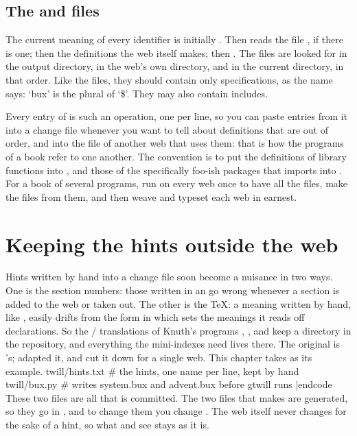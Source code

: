 \section{The  and  files}
The current meaning of every identifier is initially .
Then  reads the file , if there is one; then the
definitions the web itself makes; then . The  files are
looked for in the output directory, in the web's own directory, and in the
current directory, in that order. Like the  files, they should contain
only  specifications, as the name says: `bux' is the plural of `\$'. They
may also contain  includes.

Every entry of  is such an  operation, one per line, so you
can paste entries from it into a change file whenever you want to tell
 about definitions that are out of order, and into the  file
of another web that uses them: that is how the programs of a book refer to one
another. The convention is to put the definitions of library functions into
, and those of the specifically foo-ish packages that 
imports into . For a book of several programs, run  on
every web once to have all the  files, make the  files from
them, and then weave and typeset each web in earnest.

\chapter{Keeping the hints outside the web}
\noindent Hints written by hand into a change file soon become a nuisance in
two ways. One is the section numbers: those written in an  go wrong
whenever a section is added to the web or taken out. The other is the \TeX: a
meaning written by hand, like , easily drifts from the
form in which  sets the meanings it reads off declarations. So the
\GO/ translations of Knuth's programs , , and
 keep a directory  in the repository, and everything
the mini-indexes need lives there. The original is 's; 
adapted it, and  cut it down for a single web. This chapter takes
 as its example.
\begincode
twill/hints.txt     # the hints, one name per line, kept by hand
twill/bux.py        # writes system.bux and advent.bux before gtwill runs
|endcode
These two files are all that is committed. The two  files that
 makes are generated, so they go in , and to change
them you change . The web itself never changes for the sake of a
hint, so what  and  see stays as it is.

